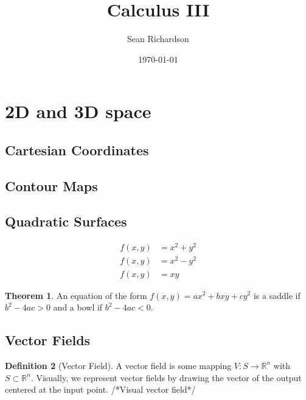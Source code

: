 \documentclass[11pt]{article}
\theoremstyle{definition}
\newtheorem{theorem}{Theorem}[section]
\newtheorem{definition}[theorem]{Definition}
\begin{document}
\title{Calculus III}
\author{Sean Richardson}
\date{\today}
\maketitle
\tableofcontents

\section{2D and 3D space}
\subsection{Cartesian Coordinates}
\subsection{Contour Maps}
\subsection{Quadratic Surfaces}
\begin{align}
    f(x,y) &= x^2+y^2
    \tag{Paraboloid}\\
    f(x,y) &= x^2-y^2
    \tag{Saddle}\\
    f(x,y) &= xy
    \tag{Saddle}
\end{align}
\begin{theorem}
    An equation of the form $f(x,y) = ax^2+bxy+cy^2$ is a saddle if
    $b^2-4ac > 0$ and a bowl if $b^2-4ac <0 $.
\end{theorem}
\subsection{Vector Fields}
\begin{definition}[Vector Field]
    A vector field is some mapping $V: S \to \mathbb{R}^n$ with $S \subset
    \mathbb{R}^n$. Visually, we represent vector fields by drawing the
    vector of the output centered at the input point.
    /*Visual vector field*/
\end{definition}
\end{document}
